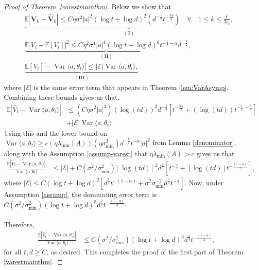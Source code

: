 \documentclass[11pt, reqno,english]{amsart}
\DeclareMathOperator{\Var}{Var} \DeclareMathOperator{\N}{N}
\begin{document}
\begin{proof}[Proof of Theorem~\ref{varestmainthm}]
Below we show that
\begin{align*}
    &\underbrace{\mathbb{E}|\mathbf{V}_k - \hat{\mathbf{V}}_k| \leq C\eta \sigma^2 |a|^2 (\log t + \log d)^2(d^{-\frac{1}{4}}t^{-\frac{3\alpha}{2}}) \quad \forall \quad 1\leq k \leq \frac{t}{2t_0},}_{(\mathbf{I})}
    \\
    &\underbrace{\mathbb{E}|V_t - \mathbb{E}[V_t]|^2 \leq C\eta^2\sigma^4|a|^4(\log t + \log d)^6 t^{-1-\alpha}d^{-\frac{1}{2}}}_{(\mathbf{II})},
    \\
    &\underbrace{\mathbb{E}[V_t] - \Var \langle a, \theta_t \rangle] \leq |\mathcal E|\Var \langle a, \theta_t \rangle,}_{(\mathbf{III})}
\end{align*}
where $|\mathcal E|$ is the same error term that appears in Theorem \ref{lem:VarAsymp}.
Combining these bounds gives us that,
\begin{align*}
    \mathbb{E}|\hat{V}_t - \Var \langle a, \theta_t \rangle| 
    &\leq (C\eta \sigma^2 |a|^2)(\log (td))^2d^{-\frac{1}{4}}[t^{-\frac{3\alpha}{2}}+(\log (td))t^{-\frac{1}{2}-\frac{\alpha}{2}}] 
    \\
    &+|\mathcal E|\Var \langle a, \theta_t \rangle
\end{align*}
Using this and the lower bound on $\Var \langle a, \theta_t \rangle \geq c (\eta \lambda_{\min}(A))(\eta\sigma^2_{\min})d^{-\frac{1}{2}}t^{-\alpha}|a|^2$ from Lemma \ref{denominator}, along with the Assumption \ref{assump-varest} that $\eta \lambda_{\min}(A) > c$ gives us that
\begin{align*}
    \frac{\mathbb{E}|\hat{V}_t - \Var \langle a , \theta_t \rangle|}{\Var \langle a, \theta_t \rangle} &\leq |\mathcal E| + C(\sigma^2/\sigma^2_{\min})[\log (td)]^2d^{\frac{1}{4}}[t^{-\frac{\alpha}{2}} + [\log (td)]t^{-\frac{(1-\alpha)}{2}}],
\end{align*}
where $|\mathcal E| \leq C(\log t + \log d)^2[d^{\frac{1}{2}}t^{-(1 - \alpha)} + \sigma^2\sigma^{-2}_{\min}d^{\frac{1}{2}}t^{-\alpha}]$. Now, under Assumption \ref{assump}, the dominating error term is $C(\sigma^2/\sigma^2_{\min})(\log t + \log d)^{3}d^{\frac{1}{4}}t^{-\frac{(1 - \alpha)}{2}}$.
\\\\
Therefore,
\begin{align*}
    \frac{\mathbb{E}|\hat{V}_t - \Var \langle a, \theta_t \rangle|}{\Var \langle a, \theta_t \rangle} &\leq 
     C(\sigma^2/\sigma^2_{\min})(\log t + \log d)^3d^{\frac{1}{4}}t^{-\frac{(1 - \alpha)}{2}},
\end{align*}
for all $t,d \geq C$, as desired. This completes the proof of the first part of Theorem \ref{varestmainthm}.

\end{proof}
\end{document}

